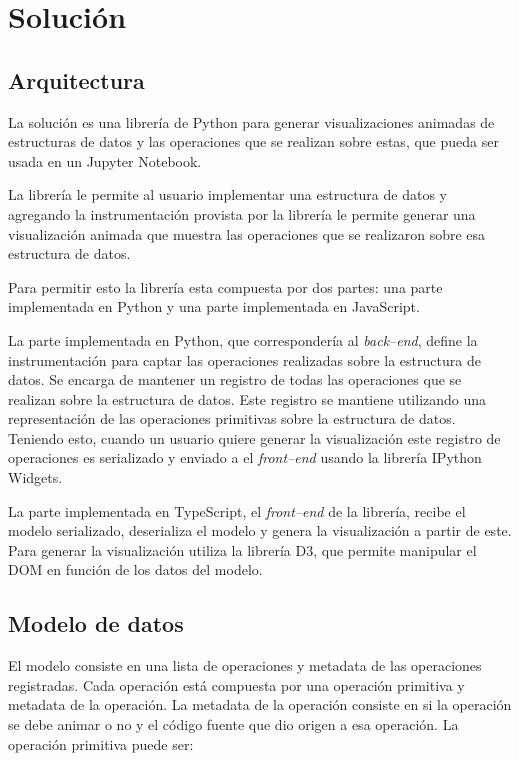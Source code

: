 \chapter{Solución}

\section{Arquitectura}

La solución es una librería de Python para generar visualizaciones animadas de estructuras de datos y las operaciones que se realizan sobre estas, que pueda ser usada en un Jupyter Notebook.

La librería le permite al usuario implementar una estructura de datos y agregando la instrumentación provista por la librería le permite generar una visualización animada que muestra las operaciones que se realizaron sobre esa estructura de datos.

Para permitir esto la librería esta compuesta por dos partes: una parte implementada en Python y una parte implementada en JavaScript.

La parte implementada en Python, que correspondería al \textit{back--end}, define la instrumentación para captar las operaciones realizadas sobre la estructura de datos. Se encarga de mantener un registro de todas las operaciones que se realizan sobre la estructura de datos. Este registro se mantiene utilizando una representación de las operaciones primitivas sobre la estructura de datos. Teniendo esto, cuando un usuario quiere generar la visualización este registro de operaciones es serializado y enviado a el \textit{front--end} usando la librería IPython Widgets.

La parte implementada en TypeScript, el \textit{front--end} de la librería, recibe el modelo serializado, deserializa el modelo y genera la visualización a partir de este. Para generar la visualización utiliza la librería D3, que permite manipular el DOM en función de los datos del modelo.

\section{Modelo de datos}

El modelo consiste en una lista de operaciones y metadata de las operaciones registradas. Cada operación está compuesta por una operación primitiva y metadata de la operación. La metadata de la operación consiste en si la operación se debe animar o no y el código fuente que dio origen a esa operación. La operación primitiva puede ser:

